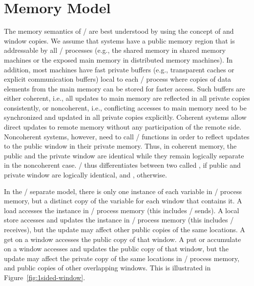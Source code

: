 \section{Memory Model}
\label{sec:1sided-memmodel}

The memory semantics of \RMA/ are best understood by using the concept of 
and  window copies.
We assume that systems have a public
memory region that is addressable by all \mpi/ processes (e.g., the shared memory
in shared memory machines or the exposed main memory in distributed
memory machines). In addition, most machines have fast private
buffers (e.g., transparent caches or explicit communication buffers)
local to each \mpi/ process where copies of data elements from the main memory
can be stored for faster access.  Such buffers are either coherent, i.e., all updates to
main memory are reflected in all private copies consistently, or
noncoherent, i.e., conflicting accesses to main memory need to be
synchronized and updated in all private copies explicitly. Coherent
systems allow direct updates to remote memory without any participation
of the remote side.  Noncoherent systems, however, need to call \RMA/
functions in order to reflect updates to the public window in their
private memory. Thus, in coherent memory, the public and the private
window are identical while they remain logically separate in the
noncoherent case.
\MPI/ thus differentiates between two 
 called 
, 
if public and private window are logically identical, and 
, otherwise. 

In the \RMA/ separate model, there is only one instance of each variable
in \mpi/ process memory, but a distinct  copy of the variable for
each window that contains it. A load accesses the instance in \mpi/ process
memory (this includes \MPI/ sends).  A local store accesses and updates the
instance in \mpi/ process memory (this includes \MPI/ receives), but the
update may affect other public copies of the same locations.  A get on a
window accesses the public copy of that window.  A put or accumulate on
a window accesses and updates the public copy of that window, but the
update may affect the private copy of the same locations in \mpi/ process
memory, and public copies of other overlapping windows.  This is
illustrated in Figure~\ref{fig:1sided-window}.

